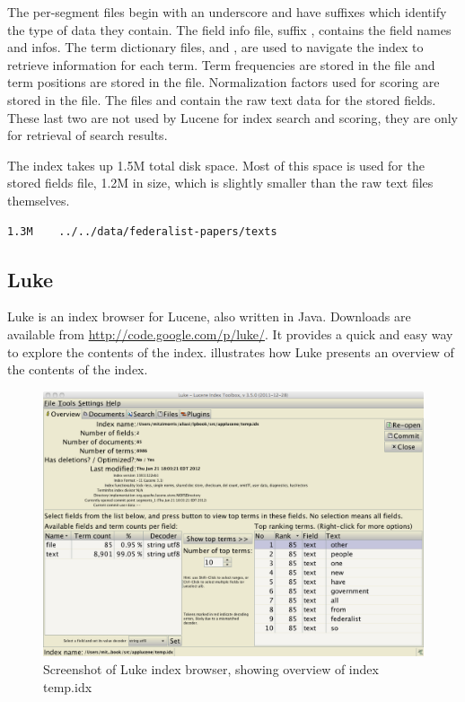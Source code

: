 The per-segment files begin with an underscore and have suffixes
which identify the type of data they contain.
The field info file, suffix , contains the field names and infos.
The term dictionary files,  and , are used to navigate the index to
retrieve information for each term.
Term frequencies are stored in the  file
and term positions are stored in the  file.
Normalization factors used for scoring are stored in the  file.
The files  and  contain the raw text data for the stored fields.
These last two are not used by Lucene for index search and scoring, they are only
for retrieval of search results.

The index takes up 1.5M total disk space.
Most of this space is used for the stored fields file, 1.2M in size,
which is slightly smaller than the raw text files themselves.
\begin{verbatim}
1.3M	../../data/federalist-papers/texts
\end{verbatim}

\subsection{Luke}

Luke is an index browser for Lucene, also written in Java.
Downloads are available from \url{http://code.google.com/p/luke/}.
It provides a quick and easy way to explore the contents of the index.
 illustrates how Luke presents an overview
of the contents of the index.

\begin{figure}[!hb]
\includegraphics[width=5.0in]{pngs/luke1.png}
\vspace*{-18pt}
\caption{Screenshot of Luke index browser, showing overview of index temp.idx}\label{fig:luke-overview}
\end{figure}

